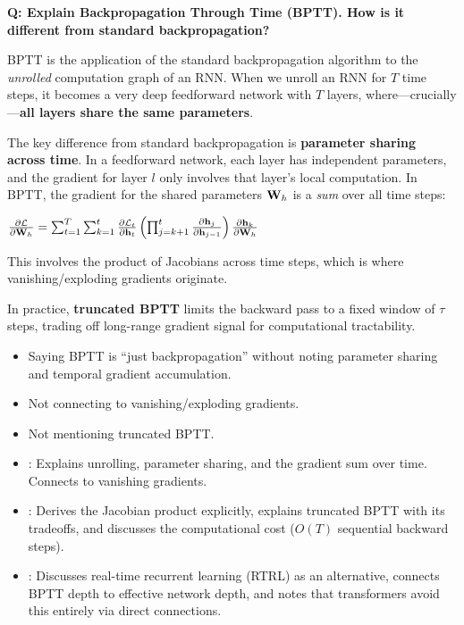\begin{interviewq}
\textbf{Q: Explain Backpropagation Through Time (BPTT). How is it
different from standard backpropagation?}

 \quad {} \quad
\badgefreq{\freqmed}

\stronganswer
BPTT is the application of the standard backpropagation algorithm to the
\emph{unrolled} computation graph of an RNN.  When we unroll an RNN for
$T$ time steps, it becomes a very deep feedforward network with $T$
layers, where---crucially---\textbf{all layers share the same parameters}.

The key difference from standard backpropagation is \textbf{parameter
sharing across time}.  In a feedforward network, each layer has
independent parameters, and the gradient for layer $l$ only involves that
layer's local computation.  In BPTT, the gradient for the shared
parameters $\mathbf{W}_h$ is a \emph{sum} over all time steps:

$\frac{\partial \mathcal{L}}{\partial \mathbf{W}_h}
= \sum_{t=1}^{T} \sum_{k=1}^{t}
  \frac{\partial \mathcal{L}_t}{\partial \mathbf{h}_t}
  \left(\prod_{j=k+1}^{t}
    \frac{\partial \mathbf{h}_j}{\partial \mathbf{h}_{j-1}}
  \right)
  \frac{\partial \mathbf{h}_k}{\partial \mathbf{W}_h}$

This involves the product of Jacobians across time steps, which is where
vanishing/exploding gradients originate.

In practice, \textbf{truncated BPTT} limits the backward pass to a
fixed window of $\tau$ steps, trading off long-range gradient signal for
computational tractability.

\redflags
\begin{itemize}
\item Saying BPTT is ``just backpropagation'' without noting parameter
  sharing and temporal gradient accumulation.
\item Not connecting to vanishing/exploding gradients.
\item Not mentioning truncated BPTT.
\end{itemize}


\goodgreat
\begin{itemize}
\item {}: Explains unrolling, parameter sharing, and the
  gradient sum over time.  Connects to vanishing gradients.
\item {}: Derives the Jacobian product explicitly, explains
  truncated BPTT with its tradeoffs, and discusses the computational
  cost ($O(T)$ sequential backward steps).
\item {}: Discusses real-time recurrent learning (RTRL) as
  an alternative, connects BPTT depth to effective network depth, and
  notes that transformers avoid this entirely via direct connections.
\end{itemize}


\end{interviewq}
